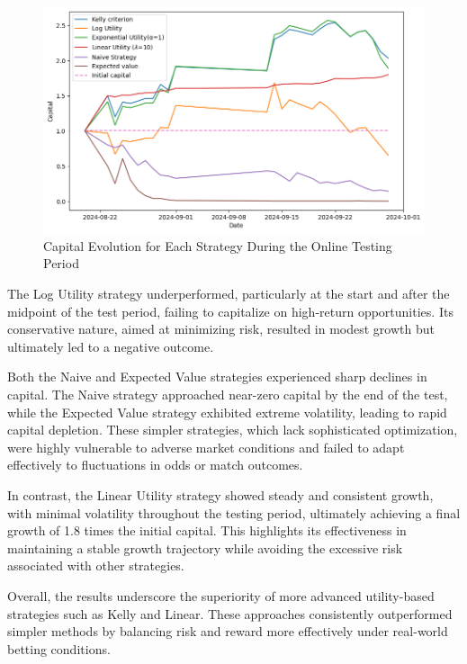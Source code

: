 \begin{figure}[H]
    \centering
    \includegraphics[width=\textwidth]{images/bankroll_evolution2.png}
    \caption{Capital Evolution for Each Strategy During the Online Testing Period}
    \label{fig:capital_evolution}
\end{figure}

The Log Utility strategy underperformed, particularly at the start and after the midpoint of the test period, failing to capitalize on high-return opportunities. Its conservative nature, aimed at minimizing risk, resulted in modest growth but ultimately led to a negative outcome. 

Both the Naive and Expected Value strategies experienced sharp declines in capital. The Naive strategy approached near-zero capital by the end of the test, while the Expected Value strategy exhibited extreme volatility, leading to rapid capital depletion. These simpler strategies, which lack sophisticated optimization, were highly vulnerable to adverse market conditions and failed to adapt effectively to fluctuations in odds or match outcomes.

In contrast, the Linear Utility strategy showed steady and consistent growth, with minimal volatility throughout the testing period, ultimately achieving a final growth of 1.8 times the initial capital. This highlights its effectiveness in maintaining a stable growth trajectory while avoiding the excessive risk associated with other strategies.

Overall, the results underscore the superiority of more advanced utility-based strategies such as Kelly and Linear. These approaches consistently outperformed simpler methods by balancing risk and reward more effectively under real-world betting conditions.

